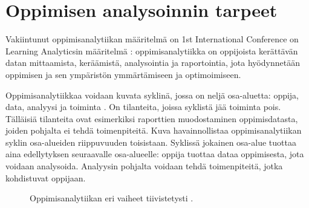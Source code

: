 \chapter{Oppimisen analysoinnin tarpeet\label{luku2}}

Vakiintunut oppimisanalytiikan määritelmä on 1st International Conference on Learning Analyticsin määritelmä \citep{siemensLearningAnalyticsEmergence2013,clowLearningAnalyticsCycle2012}: oppimisanalytiikka on oppijoista kerättävän datan mittaamista, keräämistä, analysointia ja raportointia, jota hyödynnetään oppimisen ja sen ympäristön ymmärtämiseen ja optimoimiseen.

Oppimisanalytiikkaa voidaan kuvata syklinä, jossa on neljä osa-aluetta: oppija, data, analyysi ja toiminta \citep{clowLearningAnalyticsCycle2012}. On tilanteita, joissa syklistä jää toiminta pois. Tälläisiä tilanteita ovat esimerkiksi raporttien muodostaminen oppimisdatasta, joiden pohjalta ei tehdä toimenpiteitä. Kuva havainnollistaa oppimisanalytiikan syklin osa-alueiden riippuvuuden toisistaan. Syklissä jokainen osa-alue tuottaa aina edellytyksen seuraavalle osa-alueelle: oppija tuottaa dataa oppimisesta, jota voidaan analysoida. Analyysin pohjalta voidaan tehdä toimenpiteitä,
jotka kohdistuvat oppijaan.

\begin{figure}[h]
    \centering
    \caption{Oppimisanalytiikan eri vaiheet tiivistetysti \citep{clowLearningAnalyticsCycle2012}.}
\end{figure}

